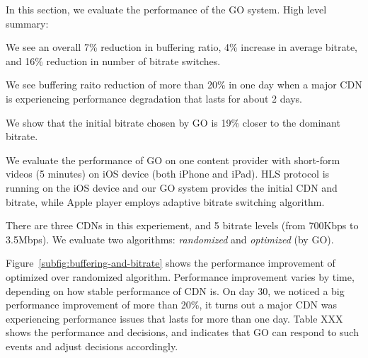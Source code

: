 





In this section, we evaluate the performance of the GO system. High level summary:
\begin{packedenumerate}
    \item We see an overall 7\% reduction in buffering ratio, 4\% increase in average bitrate, and 16\% reduction in number of bitrate switches.
    \item We see buffering raito reduction of more than 20\% in one day when a major CDN is experiencing performance degradation that lasts for about 2 days.
    \item We show that the initial bitrate chosen by GO is 19\% closer to the dominant bitrate.
\end{packedenumerate}


We evaluate the performance of GO on one content provider with short-form videos (5 minutes) on iOS device (both iPhone and iPad). 
HLS protocol is running on the iOS device and our GO system provides the initial CDN and bitrate, while Apple player employs adaptive 
bitrate switching algorithm. 

There are three CDNs in this experiement, and 5 bitrate levels (from 700Kbps to 3.5Mbps). We evaluate two algorithms: {\it randomized} 
and {\it optimized} (by GO).


Figure~\ref{subfig:buffering-and-bitrate} shows the performance improvement of optimized over randomized algorithm. Performance improvement varies by time,
depending on how stable performance of CDN is. On day 30, we noticed a big performance improvement of more than 20\%,
it turns out a major CDN was experiencing performance issues that lasts for more than one day. Table XXX shows the 
performance and decisions, and indicates that GO can respond to such events and adjust decisions accordingly.

